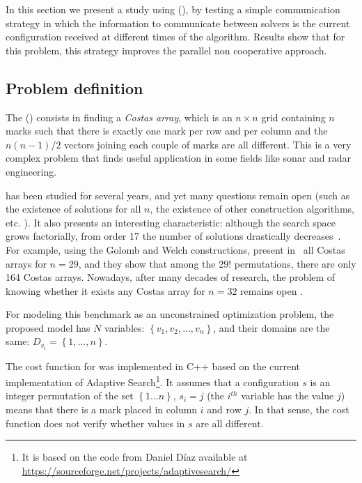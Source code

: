 In this section we present a study using \carrp{} (\CARRP), by testing a simple communication strategy in which the information to communicate between solvers is the current configuration received at different times of the algorithm. Results show that for this problem, this strategy improves the parallel non cooperative approach.

\subsection{Problem definition}

The \carrp{} (\CARRP) consists in finding a \textit{Costas array}, which is an $n\times n$ grid containing $n$ marks such that there is exactly one mark per row and per column and the ${n(n-1)/2}$ vectors joining each couple of marks are all different. This is a very complex problem that finds useful application in some fields like sonar and radar engineering.

\CARRP{} has been studied for several years, and yet many questions remain open (such as the existence of solutions for all $n$, the existence of other construction algorithms, etc. \cite{Rickard}). It also presents an interesting characteristic: although the search space grows factorially, from order 17 the number of solutions drastically decreases~\cite{Drakakis2006}. For example, using the Golomb \cite{Golomb1984a} and Welch \cite{Golomb1984} constructions,  present in~\cite{Drakakis2011} all Costas arrays for $n = 29$, and they show that among the $29!$ permutations, there are only 164 Costas arrays. %
Nowadays, after many decades of research, the problem of knowing whether it  exists any Costas array for $n = 32$ remains open \cite{Caniou14}.

For modeling this benchmark as an unconstrained optimization problem, the proposed model has $N$ variables: $\left\{v_1, v_2, \dots, v_n\right\}$, and their domains are the same: ${D_{v_i}=\left\{1, \dots, n\right\}}$.

The cost function for \CARRP{} was implemented in C++ based on the current implementation of Adaptive Search\footnote{It is based on the code from Daniel D\'{i}az available at \href{https://sourceforge.net/projects/adaptivesearch/}{https://sourceforge.net/projects/adaptivesearch/}}. It assumes that a configuration $s$ is an integer permutation of the set $\left\{1...n\right\}$, \ie $s_i = j$ (the $i^{th}$ variable has the value $j$) means that there is a mark placed in column $i$ and row $j$. In that sense, the cost function does not verify whether values in $s$ are all different.


